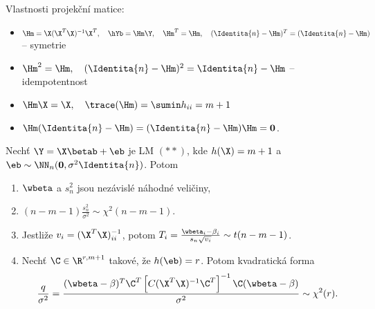 \begin{remark}
	Vlastnosti projekční matice:
	\begin{itemize}
		\item $\Hm = \X (\X^T \X)^{-1} \X^T, \quad \hYb = \Hm \Y, \quad \Hm^T = \Hm, \quad (\Identita{n} - \Hm)^T = (\Identita{n} - \Hm)$ -- symetrie
		\item $\Hm^2 = \Hm, \quad (\Identita{n} - \Hm)^2 = \Identita{n} - \Hm$ -- idempotentnost
		\item $\Hm \X = \X, \quad \trace(\Hm) = \sumin h_{ii} = m + 1$
		\item $\Hm(\Identita{n} - \Hm) = (\Identita{n} - \Hm) \Hm = \boldsymbol{0}$.
	\end{itemize}
\end{remark}

\begin{theorem}
	Nechť $\Y = \X \betab + \eb$ je LM $(**)$, kde $h(\X) = m + 1$ a $\eb \sim \NN_n(\boldsymbol{0},\sigma^2 \Identita{n})$. Potom
	\begin{enumerate}
		\item $\wbeta$ a $s_n^2$ jsou nezávislé náhodné veličiny,
		\item $(n - m - 1) \frac{s_n^2}{\sigma^2} \sim \chi^2(n - m - 1)$.
		\item Jestliže $v_i = (\X^T \X)_{ii}^{-1}$, potom $T_i = \frac{\wbeta_i - \beta_i}{s_n \sqrt{v_i}} \sim t(n-m-1)$.
		\item Nechť $\C \in \R^{r,m+1}$ takové, že $h(\eb) = r$. Potom kvadratická forma
		$$
			\frac{q}{\sigma^2} = \frac{(\wbeta - \beta)^T \C^T \left[ C (\X^T \X)^{-1} \C^T \right]^{-1} \C (\wbeta - \beta)}{\sigma^2} \sim \chi^2(r).
		$$
	\end{enumerate}
\end{theorem}
